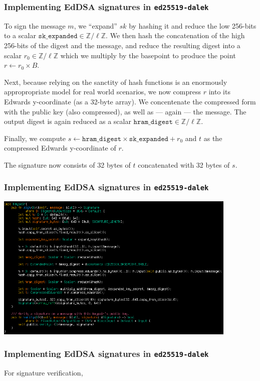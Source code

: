\documentclass[xetex,aspectratio=169]{beamer}
\newcommand{\ZZ}{\mathbb{Z}}
\begin{document}
 \begin{frame}
   \frametitle{Implementing EdDSA signatures in \texttt{ed25519-dalek}}
 
   To sign the message $m$, we ``expand'' $sk$ by hashing it and reduce the low
   256-bits to a scalar $\texttt{sk\_expanded} \in \ZZ / \ell\ZZ$.  We then hash
   the concatenation of the high 256-bits of the digest and the message, and
   reduce the resulting digest into a scalar $r_0 \in \ZZ/\ell\ZZ$ which we
   multiply by the basepoint to produce the point $r \gets r_0 \times B$.
   
   Next, because relying on the sanctity of hash functions is an enormously
   appropropriate model for real world scenarios, we now compress $r$ into its
   Edwards y-coordinate (as a 32-byte array).  We concentenate the compressed
   form with the public key (also compressed), as well as --- again --- the
   message. The output digest is again reduced as a scalar
   $\texttt{hram\_digest} \in \ZZ/\ell\ZZ$.
   
   Finally, we compute
   $s \gets \texttt{hram\_digest} \times \texttt{sk\_expanded} + r_0$ and
   $t$ as the compressed Edwards y-coordinate of $r$.
   
   The signature now consists of 32 bytes of $t$ concatenated with 32 bytes of
   $s$.
 \end{frame}
 
 \begin{frame}
   \frametitle{Implementing EdDSA signatures in \texttt{ed25519-dalek}}
 
   \begin{center}
     \includegraphics[height=7cm]{signing.png}
   \end{center}
 \end{frame}

 \begin{frame}
   \frametitle{Implementing EdDSA signatures in \texttt{ed25519-dalek}}

   For signature verification, 

 \end{frame}
\end{document}

